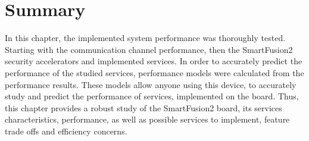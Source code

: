 \section*{Summary}\label{chap:evaluation:summary}

In this chapter, the implemented system performance was thoroughly tested. Starting with the communication channel performance, then the SmartFusion2 security accelerators and implemented services. In order to accurately predict the performance of the studied services, performance models were calculated from the performance results. These models allow anyone using this device, to accurately study and predict the performance of services, implemented on the board. Thus, this chapter provides a robust study of the SmartFusion2 board, its services characteristics, performance, as well as possible services to implement, feature trade offs and efficiency concerns.
